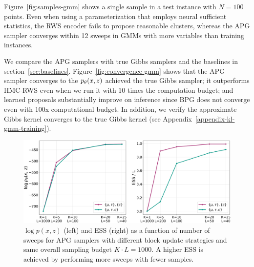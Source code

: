 \documentclass{article}
\theoremstyle{definition}
\begin{document}
Figure~\ref{fig:samples-gmm} shows a single sample in a test instance with $N=100$ points. Even when using a parameterization that employs neural sufficient statistics, the RWS encoder fails to propose reasonable clusters, whereas the APG sampler converges within 12 sweeps in GMMs with more variables than training instances.

We compare the APG samplers with true Gibbs samplers and the baselines in section~\ref{sec:baselines}. Figure~\ref{fig:convergence-gmm} shows that the APG sampler converges to the $p_\theta(x, z)$ achieved the true Gibbs sampler; it outperforms HMC-RWS even when we run it with 10 times the computation budget; and learned proposals substantially improve on inference since BPG does not converge even with 100x computational budget. In addition, we verify the approximate Gibbs kernel converges to the true Gibbs kernel (see Appendix~\ref{appendix-kl-gmm-training}).

\begin{figure}[!t]
\centering
\includegraphics[width=\columnwidth]{figures/budget_gmm.pdf}
  \caption{$\log p(x, z)$ (left) and ESS (right) as a function of number of sweeps for APG samplers with different block update strategies and same overall sampling budget $K \cdot L = 1000$. A higher ESS is achieved by performing more sweeps with fewer samples.}
  \label{fig:fixed-budget-gmm}
  \vspace{-0.75em}
\end{figure}
\end{document}
